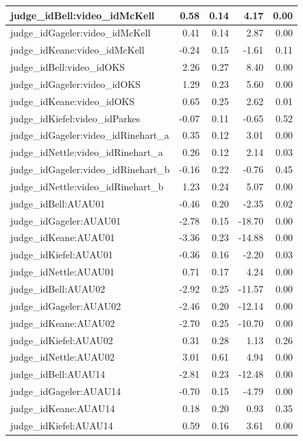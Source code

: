 \documentclass{monashthesis}
\begin{document}
\begin{tabular}{l|r|r|r|r}
judge\_idBell:video\_idMcKell & 0.58 & 0.14 & 4.17 & 0.00\\
\hline
judge\_idGageler:video\_idMcKell & 0.41 & 0.14 & 2.87 & 0.00\\
\hline
judge\_idKeane:video\_idMcKell & -0.24 & 0.15 & -1.61 & 0.11\\
\hline
judge\_idBell:video\_idOKS & 2.26 & 0.27 & 8.40 & 0.00\\
\hline
judge\_idGageler:video\_idOKS & 1.29 & 0.23 & 5.60 & 0.00\\
\hline
judge\_idKeane:video\_idOKS & 0.65 & 0.25 & 2.62 & 0.01\\
\hline
judge\_idKiefel:video\_idParkes & -0.07 & 0.11 & -0.65 & 0.52\\
\hline
judge\_idGageler:video\_idRinehart\_a & 0.35 & 0.12 & 3.01 & 0.00\\
\hline
judge\_idNettle:video\_idRinehart\_a & 0.26 & 0.12 & 2.14 & 0.03\\
\hline
judge\_idGageler:video\_idRinehart\_b & -0.16 & 0.22 & -0.76 & 0.45\\
\hline
judge\_idNettle:video\_idRinehart\_b & 1.23 & 0.24 & 5.07 & 0.00\\
\hline
judge\_idBell:AUAU01 & -0.46 & 0.20 & -2.35 & 0.02\\
\hline
judge\_idGageler:AUAU01 & -2.78 & 0.15 & -18.70 & 0.00\\
\hline
judge\_idKeane:AUAU01 & -3.36 & 0.23 & -14.88 & 0.00\\
\hline
judge\_idKiefel:AUAU01 & -0.36 & 0.16 & -2.20 & 0.03\\
\hline
judge\_idNettle:AUAU01 & 0.71 & 0.17 & 4.24 & 0.00\\
\hline
judge\_idBell:AUAU02 & -2.92 & 0.25 & -11.57 & 0.00\\
\hline
judge\_idGageler:AUAU02 & -2.46 & 0.20 & -12.14 & 0.00\\
\hline
judge\_idKeane:AUAU02 & -2.70 & 0.25 & -10.70 & 0.00\\
\hline
judge\_idKiefel:AUAU02 & 0.31 & 0.28 & 1.13 & 0.26\\
\hline
judge\_idNettle:AUAU02 & 3.01 & 0.61 & 4.94 & 0.00\\
\hline
judge\_idBell:AUAU14 & -2.81 & 0.23 & -12.48 & 0.00\\
\hline
judge\_idGageler:AUAU14 & -0.70 & 0.15 & -4.79 & 0.00\\
\hline
judge\_idKeane:AUAU14 & 0.18 & 0.20 & 0.93 & 0.35\\
\hline
judge\_idKiefel:AUAU14 & 0.59 & 0.16 & 3.61 & 0.00\\

\end{tabular}
\end{document}
